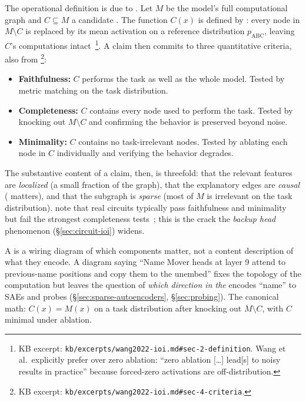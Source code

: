 The operational definition is due to \citet{wang2022-ioi}. Let $M$ be
the model's full computational graph and $C \subseteq M$ a candidate
. The function $C(x)$ is defined by \emph{}: every node
in $M \setminus C$ is replaced by its mean activation on a reference
distribution $p_{\text{ABC}}$, leaving $C$'s computations
intact~\citep[\S 2]{wang2022-ioi}\footnote{KB excerpt:
\nolinkurl{kb/excerpts/wang2022-ioi.md#sec-2-definition}. Wang et al.\
explicitly prefer  over zero ablation: ``zero ablation
[\ldots] lead[s] to noisy results in practice'' because forced-zero
activations are off-distribution.}. A \glsterm{circuit}{circuit} claim then commits to
three quantitative criteria, also from
\citet[\S 4]{wang2022-ioi}\footnote{KB excerpt:
\nolinkurl{kb/excerpts/wang2022-ioi.md#sec-4-criteria}.}:
\begin{itemize}
  \item \textbf{Faithfulness:} $C$ performs the task as well as the
    whole model. Tested by metric matching on the task distribution.
  \item \textbf{Completeness:} $C$ contains every node used to perform
    the task. Tested by knocking out $M \setminus C$ and confirming
    the behavior is preserved beyond noise.
  \item \textbf{Minimality:} $C$ contains no task-irrelevant nodes.
    Tested by ablating each node in $C$ individually and verifying the
    behavior degrades.
\end{itemize}
The substantive content of a  claim, then, is threefold: that
the relevant features are \emph{localized} (a small fraction of the
graph), that the explanatory edges are \emph{causal} ( matters),
and that the subgraph is \emph{sparse} (most of $M$ is irrelevant on
the task distribution). \citet{wang2022-ioi} note that real circuits
typically pass faithfulness and minimality but fail the strongest
completeness tests~\citep[\S 4]{wang2022-ioi}; this is the crack the
\emph{backup head} phenomenon (\S\ref{sec:circuit-ioi}) widens.

\begin{intuition}
A  is a wiring diagram of which components matter, not a content
description of what they encode. A diagram saying ``Name Mover heads at
layer 9 attend to previous-name positions and copy them to the
unembed'' fixes the topology of the computation but leaves the question
of \emph{which direction in the } encodes ``name'' to
SAEs and probes (\S\ref{sec:sparse-autoencoders}, \S\ref{sec:probing}).
The canonical math: $C(x) = M(x)$ on a task distribution after knocking
out $M \setminus C$, with $C$ minimal under ablation.
\end{intuition}

